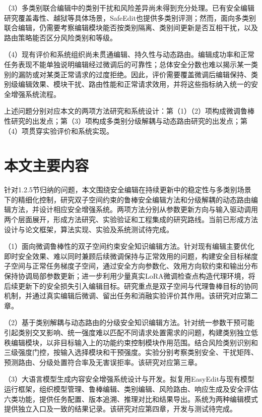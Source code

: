 （3）多类别联合编辑中的类别干扰和风险差异尚未得到充分处理。已有安全编辑研究覆盖毒性、越狱等具体场景，SafeEdit也提供多类别评测\cite{wang2024safeedit,lu2025toxedit,wang2025delman}；然而，面向多类别联合编辑，仍需要考察编辑模块能否按类别隔离、类别间更新是否互相干扰，以及路由策略能否区分风险类别和等级。

（4）现有评价和系统组织尚未贯通编辑、持久性与动态路由。编辑成功率和正常任务表现不能单独说明编辑经过微调后的可靠性；总体安全分数也难以揭示某一类别的漏防或对某类正常请求的过度拒绝。因此，评价需要覆盖微调后编辑保持、类别级编辑效果、模块干扰、路由性能和正常请求效用，并将这些指标纳入统一的安全增强系统流程。

上述问题分别对应本文的两项方法研究和系统设计：第（1）（2）项构成微调鲁棒性研究的出发点；第（3）项构成多类别分级解耦与动态路由研究的出发点；第（4）项贯穿实验评价和系统实现。

\section{本文主要内容}

针对1.2.5节归纳的问题，本文围绕安全编辑在持续更新中的稳定性与多类别场景下的精细化控制，研究双子空间约束的鲁棒安全编辑方法和分级解耦的动态路由编辑方法，并设计相应安全增强系统。两项方法分别从参数更新方向与输入驱动调用两个层面展开，形成方法研究、实验验证和工程集成的研究路线。当前已形成方法设计与论文框架，算法实现、实验及系统测试待完成。

（1）面向微调鲁棒性的双子空间约束安全知识编辑方法。针对现有编辑主要优化即时安全效果、难以同时兼顾后续微调保持与正常效用的问题，构建安全目标梯度子空间与正常任务梯度子空间，通过安全方向参数化、效用方向软约束和输出分布保持协调局部参数更新；进一步利用少量真实LoRA微调检查点构造代理环境，将后续更新下的安全损失引入编辑目标。研究重点是双子空间与代理鲁棒目标的协同机制，并通过真实编辑后微调、留出任务和消融实验评价其作用。该研究对应第二章。

（2）基于类别解耦与动态路由的分级安全知识编辑方法。针对统一参数干预可能引起类别交叉影响、统一强度难以匹配不同请求处置需求的问题，构建类别独立低秩编辑模块，以非目标输入上的功能约束控制模块作用范围。结合风险类别识别和三级强度门控，按输入选择模块和干预强度。实验分别考察类别安全、干扰矩阵、预测路由、分级处置符合率及无害误拒率。该研究对应第三章。

（3）大语言模型生成内容安全增强系统设计与开发。拟复用EasyEdit与现有模型运行框架，组织模型管理、鲁棒编辑、类别编辑、风险路由、响应生成及安全评估六类功能，提供任务配置、版本追溯、推理对比和结果导出。系统为两种编辑模式提供独立入口及一致的结果记录。该研究对应第四章，开发与测试待完成。

